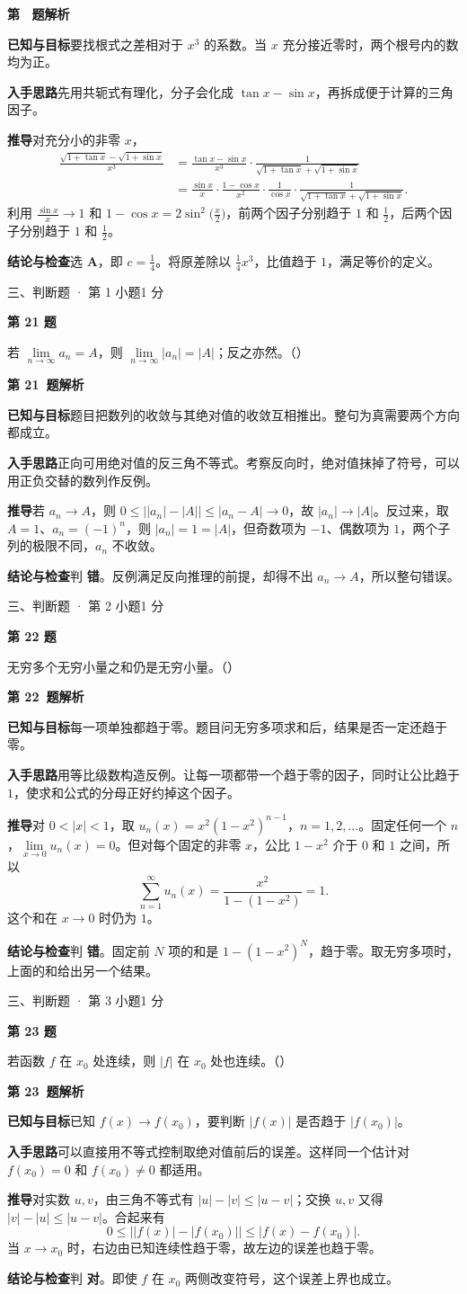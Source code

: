 \documentclass[UTF8,zihao=-4,fontset=fandol]{ctexart}
\newcommand{\choiceblank}{（\hspace{2em}）}
\newcommand{\Question}[4]{%
  \clearpage
  \def\CurrentNumber{#1}%
  \pdfbookmark[1]{第 #1 题}{q#1}%
  {\small #2 · 第 #3 小题\hfill #4 分}\par\medskip
  {\Large\bfseries 第 #1 题}\par\medskip
  \fontsize{14}{22}\selectfont
}
\newcommand{\Solution}{%
  \clearpage
  \fontsize{12}{18}\selectfont
  {\large\bfseries 第 \CurrentNumber\ 题解析}\par\smallskip
}
\newcommand{\Known}{\par\textbf{已知与目标}\quad}
\newcommand{\Method}{\par\textbf{入手思路}\quad}
\newcommand{\Derive}{\par\textbf{推导}\quad}
\newcommand{\Verify}{\par\textbf{结论与检查}\quad}
\begin{document}
\Solution
\Known 要找根式之差相对于 $x^3$ 的系数。当 $x$ 充分接近零时，两个根号内的数均为正。
\Method 先用共轭式有理化，分子会化成 $\tan x-\sin x$，再拆成便于计算的三角因子。
\Derive 对充分小的非零 $x$，
\[
\begin{aligned}
\frac{\sqrt{1+\tan x}-\sqrt{1+\sin x}}{x^3}
&=\frac{\tan x-\sin x}{x^3}
\cdot\frac{1}{\sqrt{1+\tan x}+\sqrt{1+\sin x}}\\
&=\frac{\sin x}{x}\cdot\frac{1-\cos x}{x^2}
\cdot\frac{1}{\cos x}
\cdot\frac{1}{\sqrt{1+\tan x}+\sqrt{1+\sin x}}.
\end{aligned}
\]
利用 $\frac{\sin x}{x}\to1$ 和 $1-\cos x=2\sin^2\bigl(\frac{x}{2}\bigr)$，前两个因子分别趋于 $1$ 和 $\frac12$，后两个因子分别趋于 $1$ 和 $\frac12$。
\Verify 选 \textbf{A}，即 $c=\frac14$。将原差除以 $\frac14x^3$，比值趋于 $1$，满足等价的定义。

\Question{21}{三、判断题}{1}{1}
若 $\lim\limits_{n\to\infty}a_n=A$，则 $\lim\limits_{n\to\infty}|a_n|=|A|$；反之亦然。\choiceblank

\Solution
\Known 题目把数列的收敛与其绝对值的收敛互相推出。整句为真需要两个方向都成立。
\Method 正向可用绝对值的反三角不等式。考察反向时，绝对值抹掉了符号，可以用正负交替的数列作反例。
\Derive 若 $a_n\to A$，则 $0\le\bigl||a_n|-|A|\bigr|\le|a_n-A|\to0$，故 $|a_n|\to|A|$。反过来，取 $A=1$、$a_n=(-1)^n$，则 $|a_n|=1=|A|$，但奇数项为 $-1$、偶数项为 $1$，两个子列的极限不同，$a_n$ 不收敛。
\Verify 判 \textbf{错}。反例满足反向推理的前提，却得不出 $a_n\to A$，所以整句错误。

\Question{22}{三、判断题}{2}{1}
无穷多个无穷小量之和仍是无穷小量。\choiceblank

\Solution
\Known 每一项单独都趋于零。题目问无穷多项求和后，结果是否一定还趋于零。
\Method 用等比级数构造反例。让每一项都带一个趋于零的因子，同时让公比趋于 $1$，使求和公式的分母正好约掉这个因子。
\Derive 对 $0<|x|<1$，取 $u_n(x)=x^2(1-x^2)^{n-1}$，$n=1,2,\ldots$。固定任何一个 $n$，$\lim\limits_{x\to0}u_n(x)=0$。但对每个固定的非零 $x$，公比 $1-x^2$ 介于 $0$ 和 $1$ 之间，所以
\[
\sum_{n=1}^{\infty}u_n(x)=\frac{x^2}{1-(1-x^2)}=1.
\]
这个和在 $x\to0$ 时仍为 $1$。
\Verify 判 \textbf{错}。固定前 $N$ 项的和是 $1-(1-x^2)^N$，趋于零。取无穷多项时，上面的和给出另一个结果。

\Question{23}{三、判断题}{3}{1}
若函数 $f$ 在 $x_0$ 处连续，则 $|f|$ 在 $x_0$ 处也连续。\choiceblank

\Solution
\Known 已知 $f(x)\to f(x_0)$，要判断 $|f(x)|$ 是否趋于 $|f(x_0)|$。
\Method 可以直接用不等式控制取绝对值前后的误差。这样同一个估计对 $f(x_0)=0$ 和 $f(x_0)\ne0$ 都适用。
\Derive 对实数 $u,v$，由三角不等式有 $|u|-|v|\le|u-v|$；交换 $u,v$ 又得 $|v|-|u|\le|u-v|$。合起来有
\[
0\le\bigl||f(x)|-|f(x_0)|\bigr|\le|f(x)-f(x_0)|.
\]
当 $x\to x_0$ 时，右边由已知连续性趋于零，故左边的误差也趋于零。
\Verify 判 \textbf{对}。即使 $f$ 在 $x_0$ 两侧改变符号，这个误差上界也成立。
\end{document}
